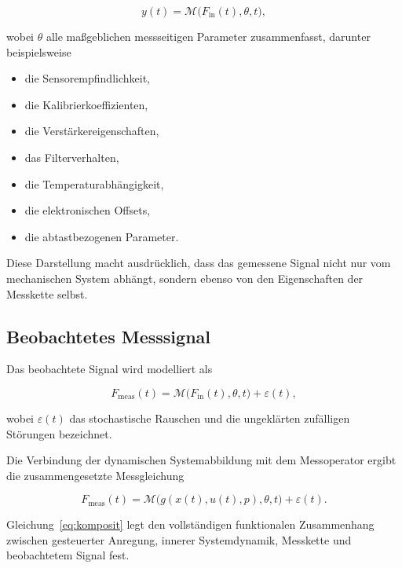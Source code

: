 \documentclass[12pt,a4paper]{report}
\begin{document}
\begin{equation}
y(t) = \mathcal{M}\bigl(F_{\mathrm{in}}(t), \theta, t\bigr),
\label{eq:messoperator}
\end{equation}

wobei $\theta$ alle maßgeblichen messseitigen Parameter zusammenfasst,
darunter beispielsweise

\begin{itemize}
\item die Sensorempfindlichkeit,
\item die Kalibrierkoeffizienten,
\item die Verstärkereigenschaften,
\item das Filterverhalten,
\item die Temperaturabhängigkeit,
\item die elektronischen Offsets,
\item die abtastbezogenen Parameter.
\end{itemize}

Diese Darstellung macht ausdrücklich, dass das gemessene Signal nicht nur
vom mechanischen System abhängt, sondern ebenso von den Eigenschaften der
Messkette selbst.

\subsection{Beobachtetes Messsignal}

Das beobachtete Signal wird modelliert als

\begin{equation}
F_{\mathrm{meas}}(t) = \mathcal{M}\bigl(F_{\mathrm{in}}(t), \theta, t\bigr) + \varepsilon(t),
\label{eq:beobachtet}
\end{equation}

wobei $\varepsilon(t)$ das stochastische Rauschen und die ungeklärten
zufälligen Störungen bezeichnet.

Die Verbindung der dynamischen Systemabbildung mit dem Messoperator
ergibt die zusammengesetzte Messgleichung

\begin{equation}
F_{\mathrm{meas}}(t) = \mathcal{M}\bigl(g(x(t),u(t),p), \theta, t\bigr) + \varepsilon(t).
\label{eq:komposit}
\end{equation}

Gleichung~\eqref{eq:komposit} legt den vollständigen funktionalen
Zusammenhang zwischen gesteuerter Anregung, innerer Systemdynamik,
Messkette und beobachtetem Signal fest.
\end{document}
